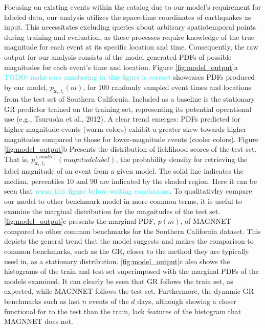 \documentclass[pdflatex]{sn-jnl}
\newcommand{\neri}[1]{{\textcolor{cyan}{#1}}}
\begin{document}
Focusing on existing events within the catalog due to our model's requirement for labeled data, our analysis utilizes the space-time coordinates of earthquakes as input. This necessitates excluding queries about arbitrary spatiotemporal points during training and evaluation, as these processes require knowledge of the true magnitude for each event at its specific location and time. Consequently, the raw output for our analysis consists of the model-generated PDFs of possible magnitudes for each event's time and location. Figure \ref{fig:model_output}a \neri{TODO: make sure numbering in this figure is correct} showcases PDFs produced by our model, $p_{\textbf{x}_i, t_i}(m)$, for 100 randomly sampled event times and locations from the test set of Southern California. Included as a baseline is the stationary GR predictor trained on the training set, representing its potential operational use (e.g., Tsuruoka et al., 2012). A clear trend emerges: PDFs predicted for higher-magnitude events (warm colors) exhibit a greater skew towards higher magnitudes compared to those for lower-magnitude events (cooler colors). Figure \ref{fig:model_output}b Presents the distribution of lieklihood scores of the test set. That is, $p_{\textbf{x}_i, t_i}^{(model)}(magntude label)$, the probability density for retrieving the label magnitude of an event from a given model. The solid line indicates the median, percentiles 10 and 90 are indicated by the shaded region. Here it can be seen that \neri{rerun this figure before writing conclusions}. To qualitativlry compare our model to other benchmark model in more common terms, it is useful to examine the marginal distribution for the magnitudes of the test set. \ref{fig:model_output}c presents the marginal PDF, $p(m)$, of MAGNNET compared to other common benchmarks for the Southern California dataset. This depicts the general trend that the model suggests and makes the comparison to common benchmarks, such as the GR, closer to the method they are typically used in, as a stationary distribution. \ref{fig:model_output}c also shows the histograms of the train and test set superimposed with the marginal PDFs of the models examined. It can clearly be seen that GR follows the train set, as expected, while MAGNNET follows the test set. Furthermore, the dynamic GR benchmarks such as last $n$ events of the $d$ days, although showing a closer functional for to the test than the train, lack features of the histogram that MAGNNET does not. 
\end{document}
